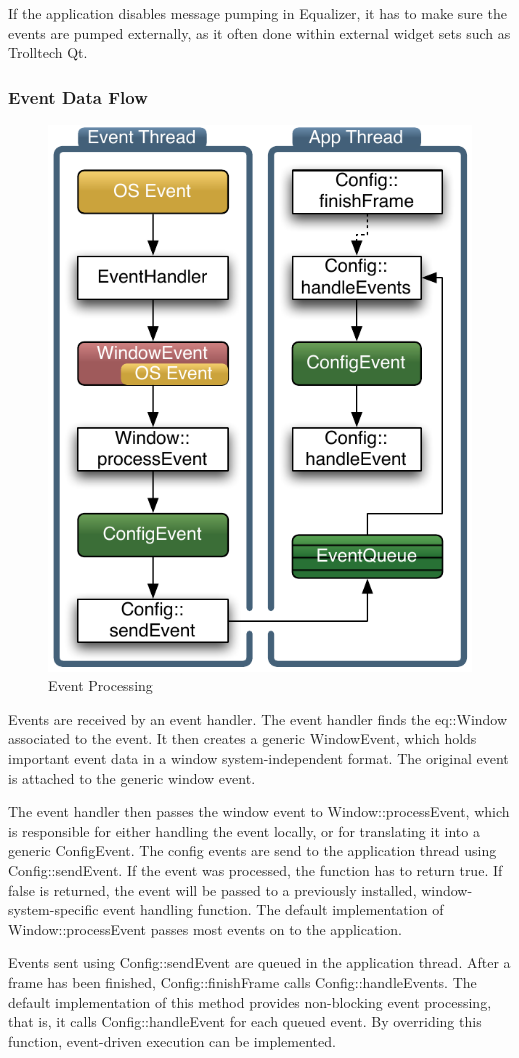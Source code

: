 \documentclass[10pt,a4]{scrartcl}
\begin{document}
If the application disables message pumping in Equalizer, it has to make
sure the events are pumped externally, as it often done within external
widget sets such as Trolltech Qt.


\subsubsection{Event Data Flow}

\begin{figure}
  \includegraphics[width=.4\textwidth]{images/eventFilter.pdf}
  {\caption{\small\label{fEventProcessing}Event Processing}}
\end{figure}
Events are received by an event handler. The event handler finds the
\textsf{eq::Window} associated to the event. It then creates a generic
\textsf{WindowEvent}, which holds important event data in a 
window system-independent format. The original event is attached to the
generic window event.

The event handler then passes the window event to
\textsf{Window::processEvent}, which is responsible for either handling
the event locally, or for translating it into a generic
\textsf{ConfigEvent}. The config events are send to the application
thread using \textsf{Config::sendEvent}. If the event was processed, the
function has to return \textsf{true}. If \textsf{false} is returned, the
event will be passed to a previously installed, window-system-specific
event handling function. The default implementation of
\textsf{Window::processEvent} passes most events on to the application.

Events sent using \textsf{Config::sendEvent} are queued in the
application thread. After a frame has been finished,
\textsf{Config::finishFrame} calls \textsf{Config::handleEvents}. The
default implementation of this method provides non-blocking event
processing, that is, it calls \textsf{Config::handleEvent} for each
queued event. By overriding this function, event-driven execution can be
implemented.
\end{document}

